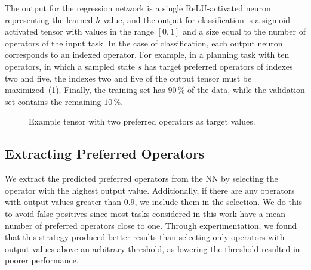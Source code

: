 \documentclass[ppgc,diss,english]{iiufrgs}
\begin{document}
The output for the regression network is a single ReLU-activated neuron representing the learned $h$-value, and the output for classification is a sigmoid-activated tensor with values in the range $[0, 1]$ and a size equal to the number of operators of the input task.
In the case of classification, each output neuron corresponds to an indexed operator. For example, in a planning task with ten operators, in which a sampled state $s$ has target preferred operators of indexes two and five, the indexes two and five of the output tensor must be maximized~(\cref{fig:po-tensor}). Finally, the training set has $90\,\%$ of the data, while the validation set contains the remaining $10\,\%$.

\begin{figure}[tb]
\caption[]{Example tensor with two preferred operators as target values.}
\vspace{\baselineskip}
\centering
{}
\label{fig:po-tensor}
\end{figure}

\subsection{Extracting Preferred Operators}
\label{sec:exp-extracting-pos}
We extract the predicted preferred operators from the NN by selecting the operator with the highest output value. Additionally, if there are any operators with output values greater than $0.9$, we include them in the selection. We do this to avoid false positives since most tasks considered in this work have a mean number of preferred operators close to one. Through experimentation, we found that this strategy produced better results than selecting only operators with output values above an arbitrary threshold, as lowering the threshold resulted in poorer performance.
\end{document}
